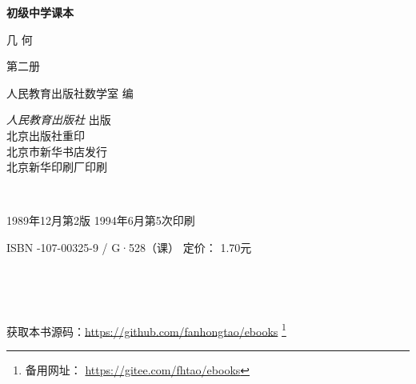 \begin{titlepage}
    \begin{center}
        \vspace*{3cm}

        {\Large \textbf{初级中学课本} }

        \vspace{1cm}

        {\Huge 几 \qquad 何}

        \vspace{1.5cm}

        {\Large 第二册}

        \vspace{1cm}

        {\Large 人民教育出版社数学室 \quad 编}

        \vfill



        \begin{CJKfilltwosides*}{0pt}
            \textit{人民教育出版社} 出版\\
            北京出版社重印 \\
            北京市新华书店发行 \\
            北京新华印刷厂印刷
        \end{CJKfilltwosides*}

        \,

        1989年12月第2版  \qquad 1994年6月第5次印刷

        ISBN -107-00325-9 \;/\; G·528（课） \quad 定价： 1.70元

        \,

        \,

        获取本书源码：\url{https://github.com/fanhongtao/ebooks} \footnote{备用网址： \url{https://gitee.com/fhtao/ebooks} }
    \end{center}

    \newpage


\end{titlepage}
